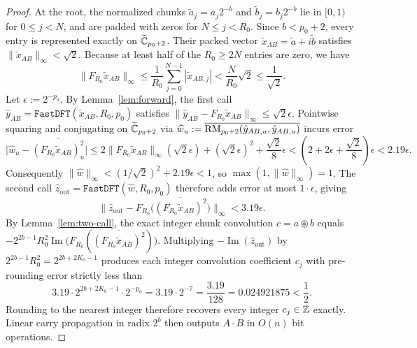 \begin{proof}
At the root, the normalized chunks $\tilde{a}_j = a_j 2^{-b}$ and $\tilde{b}_j = b_j 2^{-b}$ lie in $[0, 1)$ for $0 \le j < N$, and are padded with zeros for $N \le j < R_0$. Since $b < p_0 + 2$, every entry is represented exactly on $\widetilde{\mathbb{C}}_{p_0+2}$. Their packed vector $\tilde{x}_{AB} = \tilde{a} + i \tilde{b}$ satisfies $\|\tilde{x}_{AB}\|_\infty < \sqrt{2}$. Because at least half of the $R_0 \ge 2N$ entries are zero, we have
\[
  \|F_{R_0} \tilde{x}_{AB}\|_\infty \le \frac{1}{R_0} \sum_{j=0}^{N-1} |\tilde{x}_{AB, j}| < \frac{N}{R_0} \sqrt{2} \le \frac{1}{\sqrt{2}}.
\]
Let $\epsilon := 2^{-p_0}$. By Lemma~\ref{lem:forward}, the first call $\hat{y}_{AB} = \texttt{FastDFT}(\tilde{x}_{AB}, R_0, p_0)$ satisfies $\|\hat{y}_{AB} - F_{R_0}\tilde{x}_{AB}\|_\infty \le \sqrt{2}\epsilon$. Pointwise squaring and conjugating on $\widetilde{\mathbb{C}}_{p_0+2}$ via $\widehat{w}_u := \overline{\operatorname{RM}_{p_0+2}(\hat{y}_{AB, u}, \hat{y}_{AB, u})}$ incurs error
\[
  \bigl|\widehat{w}_u - \overline{(F_{R_0}\tilde{x}_{AB})_u^2}\bigr| \le 2 \|F_{R_0}\tilde{x}_{AB}\|_\infty (\sqrt{2}\epsilon) + (\sqrt{2}\epsilon)^2 + \frac{\sqrt{2}}{8}\epsilon < \left(2 + 2\epsilon + \frac{\sqrt{2}}{8}\right)\epsilon < 2.19\epsilon.
\]
Consequently $\|\widehat{w}\|_\infty < (1/\sqrt{2})^2 + 2.19\epsilon < 1$, so $\max(1, \|\widehat{w}\|_\infty) = 1$. The second call $\hat{z}_{\mathrm{out}} = \texttt{FastDFT}(\widehat{w}, R_0, p_0)$ therefore adds error at most $1 \cdot \epsilon$, giving
\[
  \bigl\|\hat{z}_{\mathrm{out}} - F_{R_0}\bigl(\overline{(F_{R_0}\tilde{x}_{AB})^2}\bigr)\bigr\|_\infty < 3.19\epsilon.
\]
By Lemma~\ref{lem:two-call}, the exact integer chunk convolution $c = a \circledast b$ equals $-2^{2b-1} R_0^2 \operatorname{Im}\bigl(F_{R_0}(\overline{(F_{R_0}\tilde{x}_{AB})^2})\bigr)$. Multiplying $-\operatorname{Im}(\hat{z}_{\mathrm{out}})$ by $2^{2b-1} R_0^2 = 2^{2b + 2K_0 - 1}$ produces each integer convolution coefficient $c_j$ with pre-rounding error strictly less than
\[
  3.19 \cdot 2^{2b + 2K_0 - 1} \cdot 2^{-p_0} = 3.19 \cdot 2^{-7} = \frac{3.19}{128} = 0.024921875 < \frac{1}{2}.
\]
Rounding to the nearest integer therefore recovers every integer $c_j \in \mathbb{Z}$ exactly. Linear carry propagation in radix $2^b$ then outputs $A \cdot B$ in $O(n)$ bit operations.


\end{proof}
